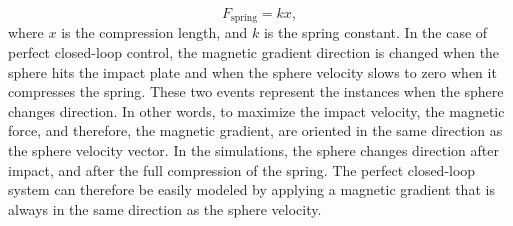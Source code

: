 \documentclass[letterpaper, 10 pt, journal, twoside]{ieeetran}
\begin{document}
\begin{equation}
F_{\text{spring}}=k x,
\label{spring_force}
\end{equation}
where $x$ is the compression length, and $k$ is the spring constant. In the case of perfect closed-loop control, the magnetic gradient direction is changed when the sphere hits the impact plate and when the sphere velocity slows to zero when it compresses the spring. These two events represent the instances when the sphere changes direction. In other words, to maximize the impact velocity, the magnetic force, and therefore, the magnetic gradient, are oriented in the same direction as the sphere velocity vector. In the simulations, the sphere changes direction after impact, and after the full compression of the spring. The perfect closed-loop system can therefore be easily modeled by applying a magnetic gradient that is always in the same direction as the sphere velocity.
\end{document}

